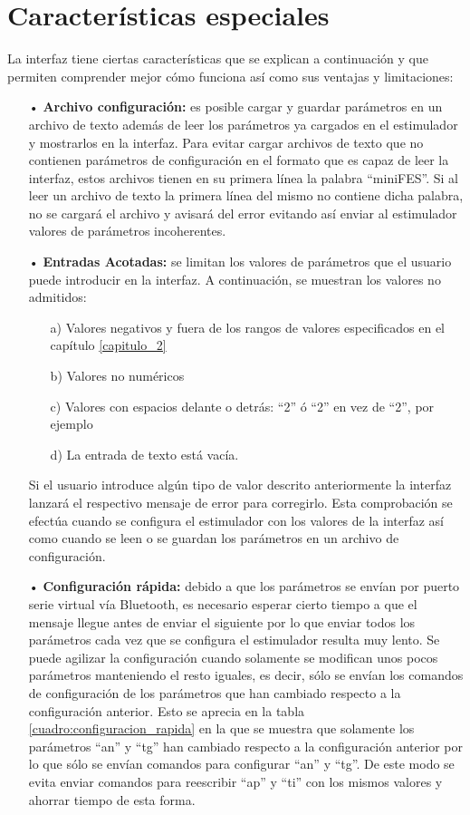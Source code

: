 \section{Características especiales}
La interfaz tiene ciertas características que se explican a continuación y que permiten comprender mejor cómo funciona así como sus ventajas y limitaciones:

\begin{itemize}
\item[•] \textbf{Archivo configuración:} es posible cargar y guardar parámetros en un archivo de texto además de leer los parámetros ya cargados en el estimulador y mostrarlos en la interfaz. Para evitar cargar archivos de texto que no contienen parámetros de configuración en el formato que es capaz de leer la interfaz, estos archivos tienen en su primera línea la palabra ``miniFES''. Si al leer un archivo de texto la primera línea del mismo no contiene dicha palabra, no se cargará el archivo y avisará del error evitando así enviar al estimulador valores de parámetros incoherentes.
\item[•] \textbf{Entradas Acotadas:} se limitan los valores de parámetros que el usuario puede introducir en la interfaz. A continuación, se muestran los valores no admitidos:
\begin{itemize}
\item[a)] Valores negativos y fuera de los rangos de valores especificados en el capítulo \ref{capitulo_2}
\item[b)] Valores no numéricos
\item[c)] Valores con espacios delante o detrás: ``2'' ó ``2'' en vez de ``2'', por ejemplo
\item[d)] La entrada de texto está vacía.
\end{itemize}
Si el usuario introduce algún tipo de valor descrito anteriormente la interfaz lanzará el respectivo mensaje de error para corregirlo. Esta comprobación se efectúa cuando se configura el estimulador con los valores de la interfaz así como cuando se leen o se guardan los parámetros en un archivo de configuración.
\item[•] \textbf{Configuración rápida: } debido a que los parámetros se envían por puerto serie virtual vía Bluetooth, es necesario esperar cierto tiempo a que el mensaje llegue antes de enviar el siguiente por lo que enviar todos los parámetros cada vez que se configura el estimulador resulta muy lento. Se puede agilizar la configuración cuando solamente se modifican unos pocos parámetros manteniendo el resto iguales, es decir, sólo se envían los comandos de configuración de los parámetros que han cambiado respecto a la configuración anterior. Esto se aprecia en la tabla \ref{cuadro:configuracion_rapida} en la que se muestra que solamente los parámetros ``an'' y ``tg'' han cambiado respecto a la configuración anterior por lo que sólo se envían comandos para configurar ``an'' y ``tg''. De este modo se evita enviar comandos para reescribir ``ap'' y ``ti'' con los mismos valores y ahorrar tiempo de esta forma.


\end{itemize}
